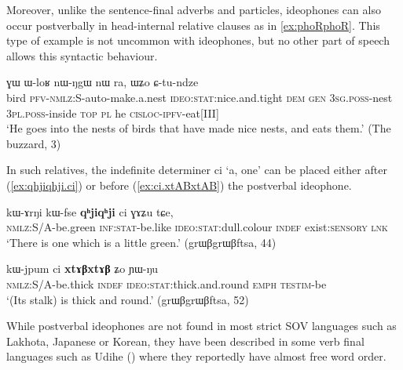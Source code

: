 \documentclass[oldfontcommands,oneside,a4paper,11pt]{article}
\newcommand{\ipa}[1]{{\phon \mbox{#1}}} %
\begin{document}
Moreover, unlike the sentence-final adverbs and particles, ideophones can also occur postverbally in head-internal relative clauses as in \ref{ex:phoRphoR}. This type of example is not uncommon with ideophones, but no other part of speech allows this syntactic behaviour.

  \begin{exe}
   \ex   \label{ex:phoRphoR}
 \gll [\ipa{pɣɤtɕɯ}  	\ipa{kɤ-kɯ-nɯ-rɤloʁ}  	\ipa{\textbf{pʰoʁpʰoʁ}}]  	\ipa{nɯ}  	\ipa{ɣɯ}  	\ipa{ɯ-loʁ}  	\ipa{nɯ-ŋgɯ}  	\ipa{nɯ}  	\ipa{ra,}  	\ipa{ɯʑo}  	\ipa{ɕ-tu-ndze}  \\
 bird \textsc{pfv-nmlz:S}-auto-make.a.nest \textsc{ideo:stat}:nice.and.tight \textsc{dem} \textsc{gen} \textsc{3sg.poss}-nest \textsc{3pl.poss}-inside  \textsc{top} \textsc{pl} he \textsc{cisloc-ipfv}-eat[III] \\
 \glt  `He goes into the nests of birds that have made nice nests, and eats them.' (The buzzard, 3)
   \end{exe}  
   
   In such relatives, the indefinite determiner \ipa{ci}   `a, one' can be placed either after (\ref{ex:qhjiqhji.ci}) or before (\ref{ex:ci.xtABxtAB}) the postverbal ideophone.
   
 \begin{exe}
\ex \label{ex:qhjiqhji.ci}
\gll 
\ipa{kɯ-ɤrŋi} 	\ipa{kɯ-fse} 	\ipa{\textbf{qʰjiqʰji}} 	\ipa{ci} 	\ipa{ɣɤʑu} 	\ipa{tɕe,} \\
\textsc{nmlz:S/A}-be.green \textsc{inf:stat}-be.like \textsc{ideo:stat}:dull.colour \textsc{indef} exist:\textsc{sensory} \textsc{lnk} \\
\glt `There is one which is a little green.' (grɯβgrɯβftsa, 44)
\end{exe}
 \begin{exe}
\ex \label{ex:ci.xtABxtAB}
\gll 
 	\ipa{kɯ-jpum} 	\ipa{ci} 	\ipa{\textbf{xtɤβxtɤβ}} 	\ipa{ʑo} 	\ipa{ɲɯ-ŋu} 	\\
 	\textsc{nmlz:S/A}-be.thick \textsc{indef} \textsc{ideo:stat}:thick.and.round \textsc{emph} \textsc{testim}-be    \\
\glt `(Its stalk) is  thick and round.' (grɯβgrɯβftsa, 52)
\end{exe}

While postverbal ideophones are not found in most strict SOV languages   such as Lakhota, Japanese or Korean,  they have been described in some verb final languages such as Udihe (\citealt[381-2]{nikolaeva01udihe}) where they reportedly have almost free word order.
\end{document}
